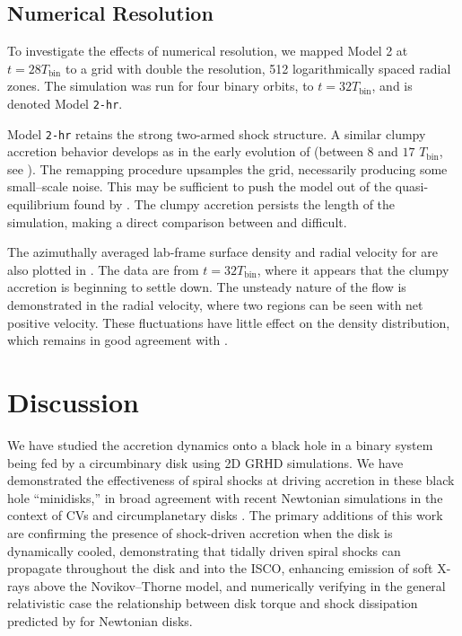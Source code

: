 \subsection{Numerical Resolution}

To investigate the effects of numerical resolution, we mapped Model 2 at $t=28T_\text{bin}$ to a grid with double the resolution, 512 logarithmically spaced radial zones.  The simulation was run for four binary orbits, to $t = 32 T_\text{bin}$, and is denoted Model \texttt{2-hr}.

Model \texttt{2-hr} retains the strong two-armed shock structure. A similar clumpy accretion behavior develops as in the early evolution of  (between $8$ and $17$ $T_\text{bin}$, see ).  The remapping procedure upsamples the  grid, necessarily producing some small--scale noise.  This may be sufficient to push the model out of the quasi-equilibrium found by . The clumpy accretion persists the length of the simulation, making a direct comparison between  and  difficult.

The azimuthally averaged lab-frame surface density and radial velocity for  are also plotted in .  The data are from $t = 32T_\text{bin}$, where it appears that the clumpy accretion is beginning to settle down.  The unsteady nature of the flow is demonstrated in the radial velocity, where two regions can be seen with net positive velocity.  These fluctuations have little effect on the density distribution, which remains in good agreement with .



\section{Discussion}

We have studied the accretion dynamics onto a black hole in a binary system being fed by a circumbinary disk using 2D GRHD simulations. We have demonstrated the effectiveness of spiral shocks at driving accretion in these black hole ``minidisks,'' in broad agreement with recent Newtonian simulations in the context of CVs \citep{Ju16}  and circumplanetary disks \citep{Zhu16}.  The primary additions of this work are confirming the presence of shock-driven accretion when the disk is dynamically cooled, demonstrating that tidally driven spiral shocks can propagate throughout the disk and into the ISCO, enhancing emission of soft X-rays above the Novikov--Thorne model, and numerically verifying in the general relativistic case the relationship between disk torque and shock dissipation predicted by \cite{Rafikov16} for Newtonian disks.

